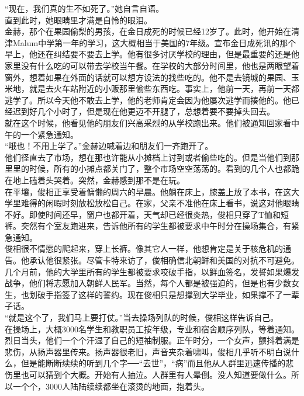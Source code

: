 “现在，我们真的生不如死了。”她自言自语。\\

直到此时，她眼睛里才满是自怜的眼泪。\\

金赫，那个在果园偷梨的男孩，在金日成死的时候已经12岁了。此时，他开始在清津Malum中学第一年的学习，这大概相当于美国的7年级。宣布金日成死讯的那个早上，他还在纠结要不要去上学。他有很多讨厌学校的理由，但是最重要的还是他家里没有什么吃的可以带去学校当午餐。在学校的大部分时间里，他也是两眼望着窗外，想着如果在外面的话就可以想方设法的找些吃的。他不是去镜城的果园、玉米地，就是去火车站附近的小贩那里偷些东西吃。事实上，他前一天，再前一天都逃学了。所以今天他不敢去上学，他的老师肯定会因为他屡次逃学而揍他的。他已经迟到好几个小时了，但是现在他更迈不开腿了，总想着要不要掉头回去。\\

就在这个时候，他看见他的朋友们兴高采烈的从学校跑出来。他们被通知回家看中午的一个紧急通知。\\

“哦也！不用上学了。”金赫边喊着边和朋友们一齐跑开了。\\

他们径直去了市场，想在那也许能从小摊档上讨到或者偷些吃的。但是当他们到那里里的时候，所有的小摊点都关门了，整个市场空空荡荡的。看到的几个人也都跪在地上磕着头哭着。突然，金赫感到那不是在玩。\\

在平壤，俊相正享受着慵懒的周六的早晨。他躺在床上，膝盖上放了本书，在这大学里难得的闲暇时刻放松放松自己。在家，父亲不准他在床上看书，说这对他眼睛不好。即使时间还早，窗户也都开着，天气却已经很炎热，俊相只穿了T恤和短裤。突然有个室友跑进来，告诉他所有的学生都被要求中午时分在操场集合，有紧急通知。\\

俊相很不情愿的爬起来，穿上长裤。像其它人一样，他想肯定是关于核危机的通告。他承认他很紧张。尽管卡特来访了，俊相确信北朝鲜和美国的对抗不可避免。几个月前，他的大学里所有的学生都被要求咬破手指，以鲜血签名，发誓如果爆发战争，他们将志愿加入朝鲜人民军。当然，每个人都是被强迫的，但是也有少数女生，也划破手指签了这样的誓约。现在俊相只是想撑到大学毕业，如果撑不了一辈子话。\\

“就是这个了，我们马上要打仗。”当去操场列队的时候，俊相这样告诉自己。\\

在操场上，大概3000名学生和教职员工按年级，专业和宿舍顺序列队，等着通知。烈日当头，他们一个个汗湿了自己的短袖制服。正午时分，一个女声，颤抖着满是悲伤，从扬声器里传来。扬声器很老旧，声音夹杂着啸叫，俊相几乎听不明白说什么，但是能断断续续的听到几个字──“去世”，“病”而且他从人群里迅速传播的悲伤里也可以猜到个大概。开始有人抽泣。人群里有人晕倒。没人知道要做什么。所以一个个，3000人陆陆续续都坐在滚烫的地面，抱着头。\\

